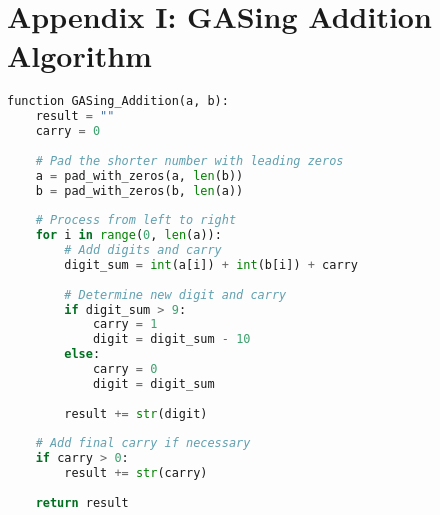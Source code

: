 
\section{Appendix I: GASing Addition Algorithm}
\label{appendix:addition}
\begin{lstlisting}[language=Python,caption={GASing Addition Algorithm}]
function GASing_Addition(a, b):
    result = ""
    carry = 0
    
    # Pad the shorter number with leading zeros
    a = pad_with_zeros(a, len(b))
    b = pad_with_zeros(b, len(a))
    
    # Process from left to right
    for i in range(0, len(a)):
        # Add digits and carry
        digit_sum = int(a[i]) + int(b[i]) + carry
        
        # Determine new digit and carry
        if digit_sum > 9:
            carry = 1
            digit = digit_sum - 10
        else:
            carry = 0
            digit = digit_sum
        
        result += str(digit)
    
    # Add final carry if necessary
    if carry > 0:
        result += str(carry)
        
    return result
\end{lstlisting}

